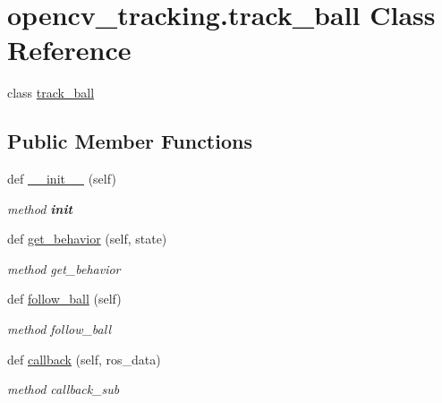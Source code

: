 \hypertarget{classopencv__tracking_1_1track__ball}{}\section{opencv\+\_\+tracking.\+track\+\_\+ball Class Reference}
\label{classopencv__tracking_1_1track__ball}


class \hyperlink{classopencv__tracking_1_1track__ball}{track\+\_\+ball}  


\subsection*{Public Member Functions}
\begin{DoxyCompactItemize}
\item 
def \hyperlink{classopencv__tracking_1_1track__ball_aab7d9901f59d6877955a8d9fbeb1dc0e}{\+\_\+\+\_\+init\+\_\+\+\_\+} (self)
\begin{DoxyCompactList}\small\item\em method {\bfseries init} \end{DoxyCompactList}\item 
def \hyperlink{classopencv__tracking_1_1track__ball_a3f89b28f29c4855aaf8bef0df281c2ef}{get\+\_\+behavior} (self, state)
\begin{DoxyCompactList}\small\item\em method get\+\_\+behavior \end{DoxyCompactList}\item 
def \hyperlink{classopencv__tracking_1_1track__ball_a97b88b8814e8df768a2a80c9e50b73d0}{follow\+\_\+ball} (self)
\begin{DoxyCompactList}\small\item\em method follow\+\_\+ball \end{DoxyCompactList}\item 
def \hyperlink{classopencv__tracking_1_1track__ball_ad0eefbf72841665b36372a1487f54960}{callback} (self, ros\+\_\+data)
\begin{DoxyCompactList}\small\item\em method callback\+\_\+sub \end{DoxyCompactList}\end{DoxyCompactItemize}
